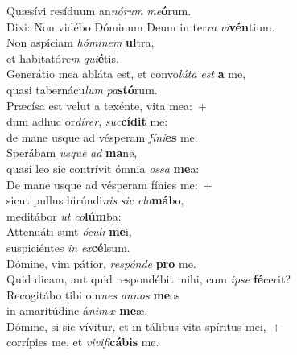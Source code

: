 \evenverse Quæsívi resíduum an\textit{nó}\textit{rum} \textit{me}\textbf{ó}rum.~\*\\
\evenverse Dixi: Non vidébo Dóminum Deum in ter\textit{ra} \textit{vi}\textbf{vén}tium.\\
\oddverse Non aspíciam \textit{hó}\textit{mi}\textit{nem} \textbf{ul}tra,~\*\\
\oddverse et habitató\textit{rem} \textit{qui}\textbf{é}tis.\\
\evenverse Generátio mea abláta est, et convo\textit{lú}\textit{ta} \textit{est} \textbf{a} me,~\*\\
\evenverse quasi tabernácu\textit{lum} \textit{pa}\textbf{stó}rum.\\
\oddverse Præcísa est velut a texénte, vita mea:~+\\
\oddverse  dum adhuc or\textit{dí}\textit{rer}, \textit{suc}\textbf{cí}\textbf{dit} me:~\*\\
\oddverse de mane usque ad vésperam \textit{fí}\textit{ni}\textbf{es} me.\\
\evenverse Sperábam \textit{us}\textit{que} \textit{ad} \textbf{ma}ne,~\*\\
\evenverse quasi leo sic contrívit ómnia \textit{os}\textit{sa} \textbf{me}a:\\
\oddverse De mane usque ad vésperam fínies me:~+\\
\oddverse  sicut pullus hirúndi\textit{nis} \textit{sic} \textit{cla}\textbf{má}bo,~\*\\
\oddverse meditábor \textit{ut} \textit{co}\textbf{lúm}ba:\\
\evenverse Attenuáti sunt \textit{ó}\textit{cu}\textit{li} \textbf{me}i,~\*\\
\evenverse suspiciéntes \textit{in} \textit{ex}\textbf{cél}sum.\\
\oddverse Dómine, vim pátior, \textit{re}\textit{spón}\textit{de} \textbf{pro} me.~\*\\
\oddverse Quid dicam, aut quid respondébit mihi, cum \textit{i}\textit{pse} \textbf{fé}cerit?\\
\evenverse Recogitábo tibi om\textit{nes} \textit{an}\textit{nos} \textbf{me}os~\*\\
\evenverse in amaritúdine á\textit{ni}\textit{mæ} \textbf{me}æ.\\
\oddverse Dómine, si sic vívitur, et in tálibus vita spíritus mei,~+\\
\oddverse  corrípies me, et \textit{vi}\textit{vi}\textit{fi}\textbf{cá}\textbf{bis} me.~\*\\
